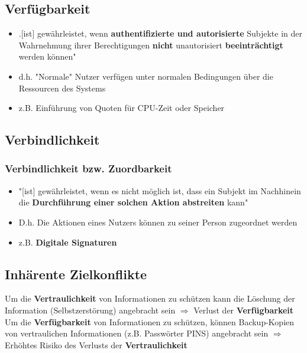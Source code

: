 \documentclass{article}
\begin{document}
\subsection{Verfügbarkeit}
\begin{itemize}
    \item .[ist] gewährleistet, wenn \textbf{authentifizierte und autorisierte} Subjekte in der Wahrnehmung ihrer Berechtigungen \textbf{nicht} unautorisiert \textbf{beeinträchtigt} werden können"
    \item d.h. "Normale" Nutzer verfügen unter normalen Bedingungen über die Ressourcen des Systems
    \item z.B. Einführung von Quoten für CPU-Zeit oder Speicher 
\end{itemize}
\subsection{Verbindlichkeit}
\subsubsection{Verbindlichkeit bzw. Zuordbarkeit}
\begin{itemize}
    \item "[ist] gewährleistet, wenn es nicht möglich ist, dass ein Subjekt im Nachhinein die \textbf{Durchführung einer solchen Aktion abstreiten} kann"
    \item D.h. Die Aktionen eines Nutzers können zu seiner Person zugeordnet werden
    \item z.B. \textbf{Digitale Signaturen}
\end{itemize}
\subsection{Inhärente Zielkonflikte}
Um die \textbf{Vertraulichkeit} von Informationen zu schützen kann die Löschung der Information (Selbstzerstörung) angebracht sein
$\Rightarrow$ Verlust der \textbf{Verfügbarkeit} \\
Um die \textbf{Verfügbarkeit} von Informationen zu schützen, können Backup-Kopien von vertraulichen Informationen (z.B. Passwörter PINS) angebracht sein
$\Rightarrow$ Erhöhtes Risiko des Verlusts der \textbf{Vertraulichkeit}
\end{document}

